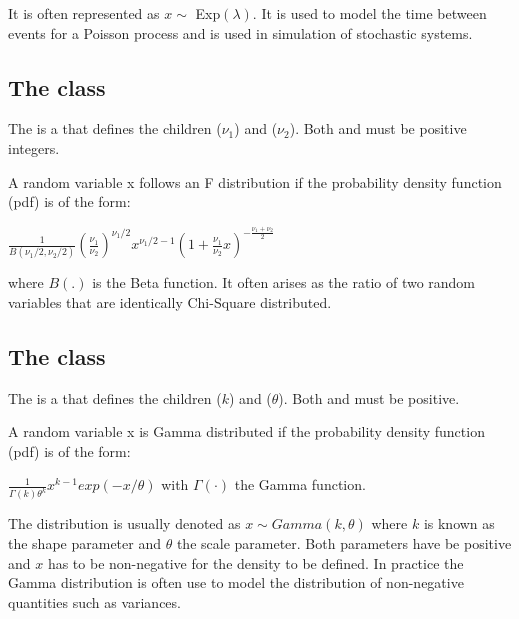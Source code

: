 It is often represented as $x \sim$ Exp$(\lambda)$. It is used to model the time between events for a Poisson process and is used in simulation of stochastic systems.

\subsection{The  class}
\label{FDistribution-class}
\label{fdistribution-class}

The \FDistribution is a \ContinuousUnivariateDistribution that defines the \UncertValue children  ($\nu_1$) and  ($\nu_2$).  Both  and  must be positive integers.

A random variable x follows an F distribution if the probability density function (pdf) is of the form:

\begin{center}
$\frac{ 1 } {B(\nu_1/2, \nu_2/2)} \left( \frac{\nu_1}{\nu_2}\right)^{\nu_1/2} x^{\nu_1/2 - 1} \left(1 + \frac{\nu_1}{\nu_2}x \right)^{-\frac{\nu_1+\nu_2}{2} }$
\end{center}

where $B(.)$ is the Beta function. It often arises as the ratio of two random variables that are identically Chi-Square distributed.

\subsection{The  class}
\label{GammaDistribution-class}
\label{gammadistribution-class}

The \GammaDistribution is a \ContinuousUnivariateDistribution that defines the \UncertValue children  ($k$) and  ($\theta$).  Both  and  must be positive.

A random variable x is Gamma distributed if the probability density function (pdf) is of the form:

\begin{center}
$\frac{1}{\Gamma(k) \theta^k} x^{k-1} exp(-x/\theta) $ with $ \Gamma(\cdot) $ the Gamma function.
\end{center}

The distribution is usually denoted as $x \sim Gamma(k, \theta)$ where $k$ is known as the shape parameter and $\theta$ the scale parameter. Both parameters have be positive and $x$ has to be non-negative for the density to be defined. In practice the Gamma distribution is often use to model the distribution of non-negative quantities such as variances.

